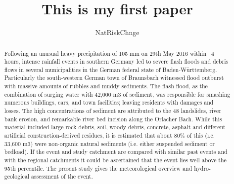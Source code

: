\documentclass[preprint,12pt]{elsarticle}
\begin{document}
\begin{frontmatter}



\title{This is my first paper}


\author{NatRiskChnge}

\address{}

\begin{abstract}
Following an unusual heavy precipitation of 105 mm on 29th May 2016 within ~4 hours, intense rainfall events in southern Germany led to severe flash floods and debris flows in several municipalities in the German federal state of Baden-W{\"u}rttemberg. Particularly the south-western German town of Braunsbach witnessed flood outburst with massive amounts of rubbles and muddy sediments. The flash flood, as the combination of surging water with 42,000 m3 of sediment, was responsible for smashing numerous buildings, cars, and town facilities; leaving residents with damages and losses. The high concentrations of sediment are attributed to the 48 landslides, river bank erosion, and remarkable river bed incision along the Orlacher Bach.  While this material included large rock debris, soil, woody debris, concrete, asphalt and different artificial construction-derived residues, it is estimated that about 80\% of this (\i.e. 33,600 m3) were non-organic natural sediments (i.e. either suspended sediment or bedload). If the event and study catchment are compared with similar past events and with the regional catchments it could be ascertained that the event lies well above the 95th percentile. The present study gives the meteorological overview and hydro-geological assessment of the event.
\end{abstract}

\begin{keyword}


\end{keyword}

\end{frontmatter}
\end{document}
